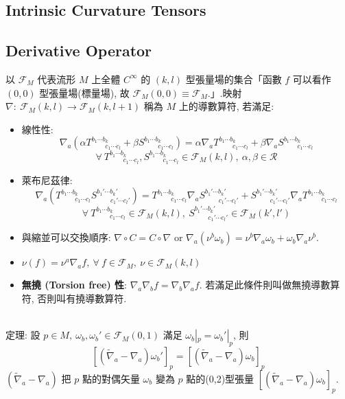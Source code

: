 \documentclass{article}
\begin{document}
\begin{CJK}{UTF8}{bsmi}
\newpage
\section{Intrinsic Curvature Tensors}
\subsection{Derivative Operator}
以 $\mathscr{F}_M$ 代表流形 $M$ 上全體 $C^\infty$ 的 $(k,l)$ 型張量場的集合「函數 $f$ 可以看作 $(0,0)$ 型張量場(標量場), 故 $\mathscr{F}_M(0,0)\equiv \mathscr{F}_M$.」.映射 $\nabla:\ \mathscr{F}_M(k,l)\rightarrow \mathscr{F}_M(k,l+1)$ 稱為 $M$ 上的導數算符, 若滿足:
\begin{itemize}
  \item 線性性: $$\nabla_a(\alpha T^{b_1\cdots b_k}_{\quad \quad c_1\cdots c_l}+\beta S^{b_1\cdots b_k}_{\quad\quad c_1\cdots c_l})=\alpha \nabla_a T^{b_1\cdots b_k}_{\quad \quad c_1\cdots c_l}+\beta \nabla_a S^{b_1\cdots b_k}_{\quad\quad c_1\cdots c_l} $$ $$ \forall\  T^{b_1\cdots b_k}_{\quad \quad c_1\cdots c_l}, S^{b_1\cdots b_k}_{\quad\quad c_1\cdots c_l}\in \mathscr{F}_M(k,l),\ \alpha, \beta \in \mathscr{R}$$
  \item 萊布尼茲律: $$\nabla_a ( T^{b_1\cdots b_k}_{\quad \quad c_1\cdots c_l} S^{b_1'\cdots b_k'}_{\quad\quad c_1'\cdots c_l'}) = T^{b_1\cdots b_k}_{\quad \quad c_1\cdots c_l}\nabla_a S^{b_1'\cdots b_k'}_{\quad\quad c_1'\cdots c_l'}+ S^{b_1'\cdots b_k'}_{\quad\quad c_1'\cdots c_l'}\nabla_a  T^{b_1\cdots b_k}_{\quad \quad c_1\cdots c_l}$$ $$ \forall\  T^{b_1\cdots b_k}_{\quad \quad c_1\cdots c_l} \in \mathscr{F}_M(k,l),\ S^{b_1'\cdots b_k'}_{\quad\quad c_1'\cdots c_l'}\in \mathscr{F}_M(k',l') $$
  \item 與縮並可以交換順序: $\nabla \circ C=C\circ \nabla$ or $\nabla_a(\nu^b \omega_b)=\nu^b\nabla_a\omega_b +\omega_b\nabla_a\nu^b$.
  \item $\nu(f)=\nu^a\nabla_a f,\ \forall\ f\in\mathscr{F}_M,\ \nu\in\mathscr{F}_M(k,l)$
  \item \textbf{無撓 (Torsion free) 性}: $\nabla_a \nabla_bf=\nabla_b\nabla_af$. 若滿足此條件則叫做無撓導數算符, 否則叫有撓導數算符.
\end{itemize}
\\

定理: 設 $p\in M,\ \omega_b, \omega_b' \in \mathscr{F}_M(0,1)$ 滿足 $\omega_b|_p=\omega_b'|_p$, 則 $$[(\tilde\nabla_a-\nabla_a)\omega_b']_p=[(\tilde\nabla_a-\nabla_a)\omega_b]_p $$
$(\tilde\nabla_a-\nabla_a)$ 把 $p$ 點的對偶矢量 $\omega_b$ 變為 $p$ 點的(0,2)型張量 $[(\tilde\nabla_a-\nabla_a)\omega_b]_p$.
\\


\end{CJK}
\end{document}
